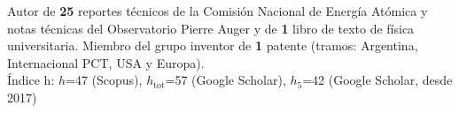 \documentclass[11pt, a4paper]{article}
\begin{document}
\begin{description}
    Autor de {\textbf{25}} reportes técnicos de la Comisión Nacional de Energía Atómica y notas técnicas del Observatorio Pierre Auger y de {\textbf{1}} libro de texto de física universitaria.
    Miembro del grupo inventor de {\textbf{1}} patente (tramos: Argentina, Internacional PCT, USA y Europa).\\
    Índice h: $h$=47 (Scopus), $h_{\mathrm{tot}}$=57 (Google Scholar), $h_{\mathrm{5}}$=42 (Google Scholar, desde 2017)
  \end{description}
\end{document}
